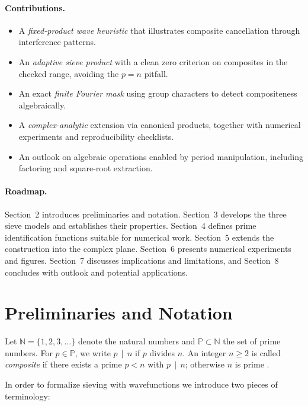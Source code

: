 \documentclass[12pt]{article}
\theoremstyle{definition}
\theoremstyle{remark}
\newcommand{\N}{\mathbb{N}}
\newcommand{\Primes}{\mathbb{P}}
\newcommand{\divides}{\,\mid\,}
\begin{document}
\paragraph{Contributions.}
\begin{itemize}
  \item A \emph{fixed-product wave heuristic} that illustrates composite cancellation through interference patterns.
  \item An \emph{adaptive sieve product} with a clean zero criterion on composites in the checked range, avoiding the \(p=n\) pitfall.
  \item An exact \emph{finite Fourier mask} using group characters to detect compositeness algebraically.
  \item A \emph{complex-analytic} extension via canonical products, together with numerical experiments and reproducibility checklists.
  \item An outlook on algebraic operations enabled by period manipulation, including factoring and square-root extraction.
\end{itemize}

\paragraph{Roadmap.} 
Section~2 introduces preliminaries and notation. Section~3 develops the three sieve models and establishes their properties. Section~4 defines prime identification functions suitable for numerical work. Section~5 extends the construction into the complex plane. Section~6 presents numerical experiments and figures. Section~7 discusses implications and limitations, and Section~8 concludes with outlook and potential applications.

\section{Preliminaries and Notation}

Let $\N = \{1,2,3,\dots\}$ denote the natural numbers and $\Primes \subset \N$ the set of prime numbers. 
For $p \in \Primes$, we write $p \divides n$ if $p$ divides $n$. 
An integer $n \ge 2$ is called \emph{composite} if there exists a prime $p < n$ with $p \divides n$; otherwise $n$ is prime \citep{hardy2008introduction,ribenboim1991book}.

In order to formalize sieving with wavefunctions we introduce two pieces of terminology:
\end{document}

